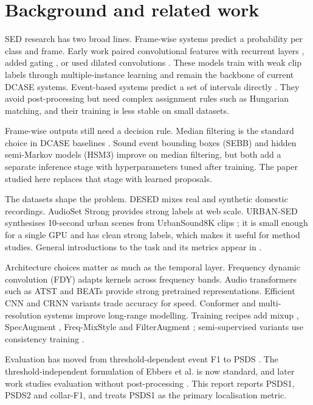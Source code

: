 \section{Background and related work}

SED research has two broad lines. Frame-wise systems predict a probability per
class and frame. Early work paired convolutional features with recurrent layers
\cite{cakir2017}, added gating \cite{xu2018}, or used dilated convolutions
\cite{li2020}. These models train with weak clip labels through multiple-instance
learning \cite{kumar2016,wang2019} and remain the backbone of current DCASE
systems. Event-based systems predict a set of intervals directly
\cite{venkatesh2022,ye2021,bhosale2024}. They avoid post-processing but need
complex assignment rules such as Hungarian matching, and their training is less
stable on small datasets.

Frame-wise outputs still need a decision rule. Median filtering is the standard
choice in DCASE baselines \cite{turpault2019}. Sound event bounding boxes (SEBB)
\cite{ebbers2024} and hidden semi-Markov models (HSM3) \cite{yoshinaga2025}
improve on median filtering, but both add a separate inference stage with
hyperparameters tuned after training. The paper studied here replaces that stage
with learned proposals.

The datasets shape the problem. DESED \cite{turpault2019} mixes real and
synthetic domestic recordings. AudioSet Strong \cite{hershey2021} provides
strong labels at web scale. URBAN-SED \cite{salamon2017urbansed} synthesises
10-second urban scenes from UrbanSound8K clips \cite{salamon2014}; it is small
enough for a single GPU and has clean strong labels, which makes it useful for
method studies. General introductions to the task and its metrics appear in
\cite{mesaros2021,virtanen2018}.

Architecture choices matter as much as the temporal layer. Frequency dynamic
convolution (FDY) \cite{nam2022fdy} adapts kernels across frequency bands.
Audio transformers such as ATST \cite{li2024atst} and BEATs
\cite{chen2023beats} provide strong pretrained representations. Efficient CNN
and CRNN variants \cite{morocutti2025} trade accuracy for speed. Conformer and
multi-resolution systems \cite{barahona2023} improve long-range modelling.
Training recipes add mixup \cite{zhang2018mixup}, SpecAugment
\cite{park2019specaugment}, Freq-MixStyle \cite{kim2022freqmix} and
FilterAugment \cite{nam2022filteraug}; semi-supervised variants use consistency
training \cite{tarvainen2017}.

Evaluation has moved from threshold-dependent event F1 to PSDS
\cite{bilen2020}. The threshold-independent formulation of Ebbers et al.
\cite{ebbers2022} is now standard, and later work studies evaluation without
post-processing \cite{ebbers2023}. This report reports PSDS1, PSDS2 and
collar-F1, and treats PSDS1 as the primary localisation metric.
